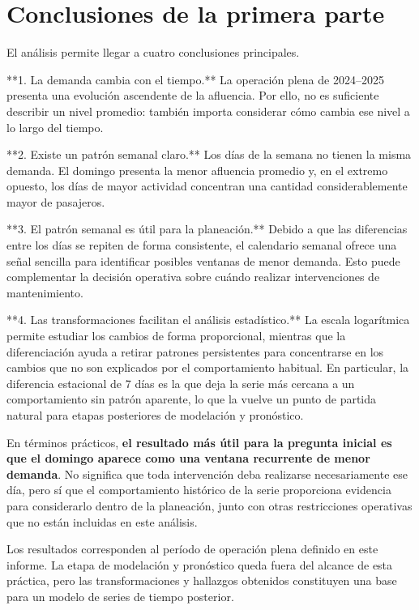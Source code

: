 \documentclass[
  12pt,
  titlepage]{article}
\begin{document}
\section{Conclusiones de la primera parte}\label{conclusiones-de-la-primera-parte}

\begin{hallazgo}
El análisis permite llegar a cuatro conclusiones principales.

**1. La demanda cambia con el tiempo.** La operación plena de 2024--2025 presenta una evolución ascendente de la afluencia. Por ello, no es suficiente describir un nivel promedio: también importa considerar cómo cambia ese nivel a lo largo del tiempo.

**2. Existe un patrón semanal claro.** Los días de la semana no tienen la misma demanda. El domingo presenta la menor afluencia promedio y, en el extremo opuesto, los días de mayor actividad concentran una cantidad considerablemente mayor de pasajeros.

**3. El patrón semanal es útil para la planeación.** Debido a que las diferencias entre los días se repiten de forma consistente, el calendario semanal ofrece una señal sencilla para identificar posibles ventanas de menor demanda. Esto puede complementar la decisión operativa sobre cuándo realizar intervenciones de mantenimiento.

**4. Las transformaciones facilitan el análisis estadístico.** La escala logarítmica permite estudiar los cambios de forma proporcional, mientras que la diferenciación ayuda a retirar patrones persistentes para concentrarse en los cambios que no son explicados por el comportamiento habitual. En particular, la diferencia estacional de 7 días es la que deja la serie más cercana a un comportamiento sin patrón aparente, lo que la vuelve un punto de partida natural para etapas posteriores de modelación y pronóstico.
\end{hallazgo}

En términos prácticos, \textbf{el resultado más útil para la pregunta inicial es que el domingo aparece como una ventana recurrente de menor demanda}. No significa que toda intervención deba realizarse necesariamente ese día, pero sí que el comportamiento histórico de la serie proporciona evidencia para considerarlo dentro de la planeación, junto con otras restricciones operativas que no están incluidas en este análisis.

\begin{notatecnica}
Los resultados corresponden al período de operación plena definido en este informe. La etapa de modelación y pronóstico queda fuera del alcance de esta práctica, pero las transformaciones y hallazgos obtenidos constituyen una base para un modelo de series de tiempo posterior.
\end{notatecnica}
\end{document}
